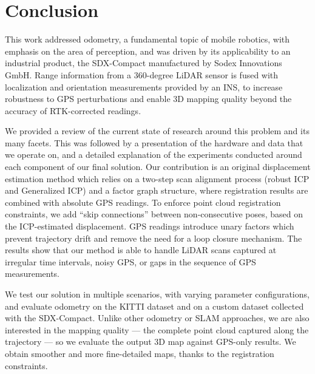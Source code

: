 \chapter{Conclusion}
\label{ch:conclusion}

This work addressed odometry, a fundamental topic of mobile robotics, with emphasis on the area of perception, and was driven by its applicability to an industrial product, the SDX-Compact manufactured by Sodex Innovations GmbH. Range information from a 360-degree LiDAR sensor is fused with localization and orientation measurements provided by an INS, to increase robustness to GPS perturbations and enable 3D mapping quality beyond the accuracy of RTK-corrected readings.

We provided a review of the current state of research around this problem and its many facets. This was followed by a presentation of the hardware and data that we operate on, and a detailed explanation of the experiments conducted around each component of our final solution. Our contribution is an original displacement estimation method which relies on a two-step scan alignment process (robust ICP and Generalized ICP) and a factor graph structure, where registration results are combined with absolute GPS readings. To enforce point cloud registration constraints, we add ``skip connections'' between non-consecutive poses, based on the ICP-estimated displacement. GPS readings introduce unary factors which prevent trajectory drift and remove the need for a loop closure mechanism. The results show that our method is able to handle LiDAR scans captured at irregular time intervals, noisy GPS, or gaps in the sequence of GPS measurements.

We test our solution in multiple scenarios, with varying parameter configurations, and evaluate odometry on the KITTI dataset \cite{geiger2013vision} and on a custom dataset collected with the SDX-Compact. Unlike other odometry or SLAM approaches, we are also interested in the mapping quality --- the complete point cloud captured along the trajectory --- so we evaluate the output 3D map against GPS-only results. We obtain smoother and more fine-detailed maps, thanks to the registration constraints.

